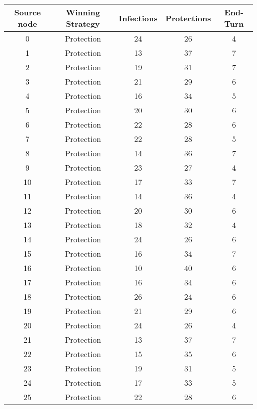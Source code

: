 \documentclass[results.tex]{subfiles}
\begin{document}
\begin{center}
  \begin{tabular}{| c || c | c | c | c |}
    \hline
    {\bfseries Source node} & {\bfseries Winning Strategy} & {\bfseries Infections} & {\bfseries Protections} & {\bfseries End-Turn} \\  %
    \hline\hline
    0 & Protection & 24 & 26 & 4 \\ 
    \hline
    1 & Protection & 13 & 37 & 7 \\ 
    \hline
    2 & Protection & 19 & 31 & 7 \\ 
    \hline
    3 & Protection & 21 & 29 & 6 \\ 
    \hline
    4 & Protection & 16 & 34 & 5 \\ 
    \hline
    5 & Protection & 20 & 30 & 6 \\ 
    \hline
    6 & Protection & 22 & 28 & 6 \\ 
    \hline
    7 & Protection & 22 & 28 & 5 \\ 
    \hline
    8 & Protection & 14 & 36 & 7 \\ 
    \hline
    9 & Protection & 23 & 27 & 4 \\ 
    \hline
    10 & Protection & 17 & 33 & 7 \\ 
    \hline
    11 & Protection & 14 & 36 & 4 \\ 
    \hline
    12 & Protection & 20 & 30 & 6 \\ 
    \hline
    13 & Protection & 18 & 32 & 4 \\ 
    \hline
    14 & Protection & 24 & 26 & 6 \\ 
    \hline
    15 & Protection & 16 & 34 & 7 \\ 
    \hline
    16 & Protection & 10 & 40 & 6 \\ 
    \hline
    17 & Protection & 16 & 34 & 6 \\ 
    \hline
    18 & Protection & 26 & 24 & 6 \\ 
    \hline
    19 & Protection & 21 & 29 & 6 \\ 
    \hline
    20 & Protection & 24 & 26 & 4 \\ 
    \hline
    21 & Protection & 13 & 37 & 7 \\ 
    \hline
    22 & Protection & 15 & 35 & 6 \\ 
    \hline
    23 & Protection & 19 & 31 & 5 \\ 
    \hline
    24 & Protection & 17 & 33 & 5 \\ 
    \hline
    25 & Protection & 22 & 28 & 6 \\ 

\end{tabular}
\end{center}
\end{document}
